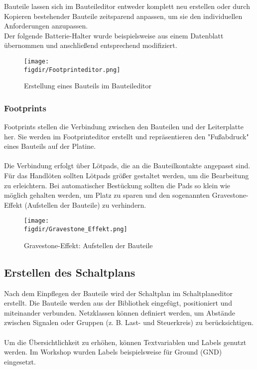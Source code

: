 \noindent
Bauteile lassen sich im Bauteileditor entweder komplett neu erstellen oder durch Kopieren bestehender Bauteile zeitsparend anpassen, um sie den individuellen Anforderungen anzupassen.\\
Der folgende Batterie-Halter wurde beispielsweise aus einem Datenblatt übernommen und anschließend entsprechend modifiziert.

\begin{figure}[h]  
    \centering  
    \texttt{[image: \\figdir/Footprinteditor.png]}  
    \caption{Erstellung eines Bauteils im Bauteileditor} 
    \label{fig:Abbildung 7} 
\end{figure}  

\newpage

\subsubsection{Footprints}  
Footprints stellen die Verbindung zwischen den Bauteilen und der Leiterplatte her. Sie werden im Footprinteditor erstellt und repräsentieren den "Fußabdruck" eines Bauteils auf der Platine.\\
\\
Die Verbindung erfolgt über Lötpads, die an die Bauteilkontakte angepasst sind. Für das Handlöten sollten Lötpads größer gestaltet werden, um die Bearbeitung zu erleichtern.
Bei automatischer Bestückung sollten die Pads so klein wie möglich gehalten werden, um Platz zu sparen und den sogenannten Gravestone-Effekt (Aufstellen der Bauteile) zu verhindern.  

\begin{figure}[h]  
    \centering  
    \texttt{[image: \\figdir/Gravestone\_Effekt.png]}  
    \caption{Gravestone-Effekt: Aufstellen der Bauteile}
    \label{fig:Abbildung 8}  
\end{figure}  
\newpage

\subsection{Erstellen des Schaltplans}  
Nach dem Einpflegen der Bauteile wird der Schaltplan im Schaltplaneditor erstellt. Die Bauteile werden aus der Bibliothek eingefügt, positioniert und miteinander verbunden. Netzklassen können definiert werden, um Abstände zwischen Signalen oder Gruppen (z. B. Last- und Steuerkreis) zu berücksichtigen.\\  
\\
Um die Übersichtlichkeit zu erhöhen, können Textvariablen und Labels genutzt werden. Im Workshop wurden Labels beispielsweise für Ground (GND) eingesetzt.  

